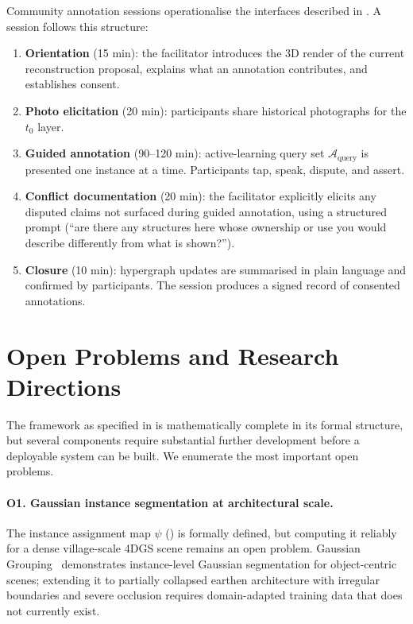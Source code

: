 \documentclass[11pt,a4paper]{article}
\theoremstyle{plain}
\theoremstyle{definition}
\theoremstyle{remark}
\newcommand{\inst}{\psi}
\begin{document}
Community annotation sessions operationalise the interfaces described
in . A session follows this structure:
\begin{enumerate}[leftmargin=2em]
  \item \textbf{Orientation} (15 min): the facilitator introduces
    the 3D render of the current reconstruction proposal, explains
    what an annotation contributes, and establishes consent.
  \item \textbf{Photo elicitation} (20 min): participants share
    historical photographs for the $t_0$ layer.
  \item \textbf{Guided annotation} (90--120 min): active-learning
    query set $\mathcal{A}_{\mathrm{query}}$ is presented one
    instance at a time. Participants tap, speak, dispute, and assert.
  \item \textbf{Conflict documentation} (20 min): the facilitator
    explicitly elicits any disputed claims not surfaced during guided
    annotation, using a structured prompt (``are there any structures
    here whose ownership or use you would describe differently from
    what is shown?'').
  \item \textbf{Closure} (10 min): hypergraph updates are summarised
    in plain language and confirmed by participants. The session
    produces a signed record of consented annotations.
\end{enumerate}

\section{Open Problems and Research Directions}
\label{sec:open}

The framework as specified in 
is mathematically complete in its formal structure, but
several components require substantial further development before
a deployable system can be built. We enumerate the most important
open problems.

\paragraph{O1. Gaussian instance segmentation at architectural scale.}
The instance assignment map $\inst$ () is
formally defined, but computing it reliably for a dense village-scale
4DGS scene remains an open problem. Gaussian Grouping~\cite{ye2024gaussian}
demonstrates instance-level Gaussian segmentation for object-centric
scenes; extending it to partially collapsed earthen architecture with
irregular boundaries and severe occlusion requires domain-adapted
training data that does not currently exist.
\end{document}
